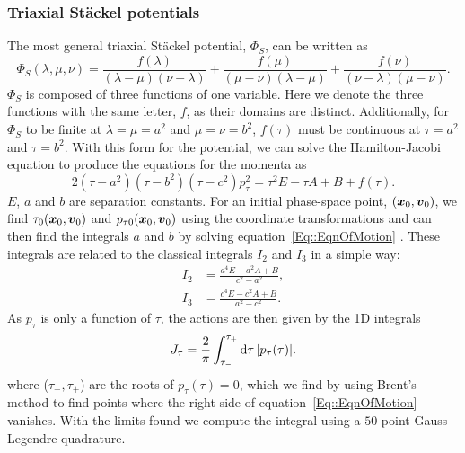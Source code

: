 \documentclass[useAMS,usenatbib,fleqn,a4paper]{mn2e}
\begin{document}
\subsubsection{Triaxial St\"ackel potentials}

The most general triaxial St\"ackel potential, $\Phi_S$, can be written as
\begin{equation}
\Phi_S(\lambda,\mu,\nu) = \frac{f(\lambda)}{(\lambda-\mu)(\nu-\lambda)}+\frac{f(\mu)}{(\mu-\nu)(\lambda-\mu)}+\frac{f(\nu)}{(\nu-\lambda)(\mu-\nu)}.
\end{equation}
$\Phi_S$ is composed of three functions of one variable. Here we denote the three functions with the same letter, $f$, as their domains are distinct. Additionally, for $\Phi_S$ to be finite at $\lambda=\mu=a^2$ and $\mu=\nu=b^2$, $f(\tau)$ must be continuous at $\tau=a^2$ and $\tau=b^2$. With this form for the potential, we can solve the Hamilton-Jacobi equation \citep{deZeeuw1985a} to produce the equations for the momenta as
\begin{equation}
2(\tau-a^2)(\tau-b^2)(\tau-c^2)p_\tau^2=\tau^2 E -\tau A+B + f(\tau).
\label{Eq::EqnOfMotion}
\end{equation}
$E$, $a$ and $b$ are separation constants.
For an initial phase-space point, $(\vx_0,\vv_0)$, we find $\tau_0(\vx_0,\vv_0)$ and $p_{\tau 0}(\vx_0,\vv_0)$ using the coordinate transformations and can then find the integrals $a$ and $b$ by solving equation~\eqref{Eq::EqnOfMotion} \citep[see][for more details]{deZeeuw1985a}. These integrals are related to the classical integrals $I_2$ and $I_3$ in a simple way:
\begin{equation}
\begin{split}
I_2&=\frac{a^4 E-a^2 A+B}{c^2-a^2},\\
I_3&=\frac{c^4E-c^2 A+B}{a^2-c^2}.
\end{split}
\end{equation}
As $p_\tau$ is only a function of $\tau$,
the actions are then given by the 1D integrals
\begin{equation}
J_\tau = \frac{2}{\pi}\int_{\tau_-}^{\tau_+} \mathrm{d}\tau\,|p_\tau(\tau)|.
\label{Eq::action}
\end{equation}
where ($\tau_-,\tau_+$) are the roots of $p_\tau(\tau)=0$, which we find by
using Brent's method to find points where the right side of equation~\eqref{Eq::EqnOfMotion} vanishes. With the limits found we compute the integral using a $50$-point Gauss-Legendre quadrature.
\end{document}
